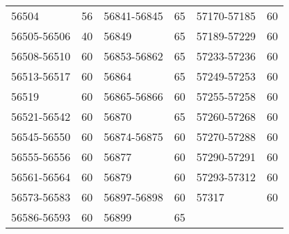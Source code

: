 \begin{center}
\begin{singlespacing}
\begin{longtable}{lr|lr|lr}
56504 & 56 & 56841-56845 & 65 & 57170-57185 & 60 \\
56505-56506 & 40 & 56849 & 65 & 57189-57229 & 60 \\
56508-56510 & 60 & 56853-56862 & 65 & 57233-57236 & 60 \\
56513-56517 & 60 & 56864 & 65 & 57249-57253 & 60 \\
56519 & 60 & 56865-56866 & 60 & 57255-57258 & 60 \\
56521-56542 & 60 & 56870 & 65 & 57260-57268 & 60 \\
56545-56550 & 60 & 56874-56875 & 60 & 57270-57288 & 60 \\
56555-56556 & 60 & 56877 & 60 & 57290-57291 & 60 \\
56561-56564 & 60 & 56879 & 60 & 57293-57312 & 60 \\
56573-56583 & 60 & 56897-56898 & 60 & 57317 & 60 \\
56586-56593 & 60 & 56899 & 65 & & \\

\end{longtable}
\end{singlespacing}
\end{center}
\vspace{20pt}